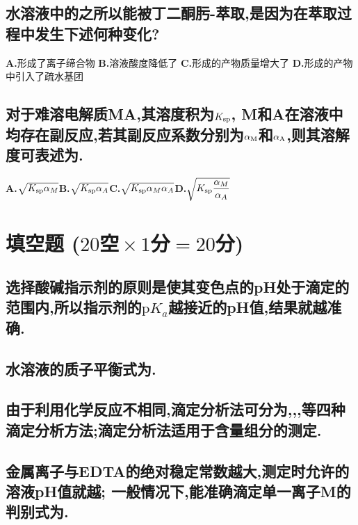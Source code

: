 \documentclass[UTF8]{article}
\newcommand{\p}{\mathrm{p}}
\newcommand{\shortline}{\underline{\hspace{1cm}}}
\newcommand{\longline}{\underline{\hspace{2cm}}}
\newcommand{\bfA}{\textbf{A.}}
\newcommand{\bfB}{\qquad \textbf{B.}}
\newcommand{\bfC}{\qquad \textbf{C.}}
\newcommand{\bfD}{\qquad \textbf{D.}}
\newcommand{\ind}{\hspace{-1pt}}
\newcommand{\indLarge}{\hspace{-0.6cm}}
\begin{document}
    \subsection{水溶液中的\ind 之所以能被丁二酮肟-萃取,是因为在萃取过程中发生下述何种变化?}
        \indLarge \bfA {}\ind 形成了离子缔合物
        \indLarge \bfB 溶液酸度降低了
        \indLarge \bfC {}\ind 形成的产物质量增大了
        \indLarge \bfD {}\ind 形成的产物中引入了疏水基团

    \subsection{对于难溶电解质MA,其溶度积为$K_{\ce{sp}}$, M和A在溶液中均存在副反应,若其副反应系数分别为$\alpha_{\ce{M}}$和$\alpha_{\ce{A}}$,则其溶解度可表述为\shortline.}
    \bfA $\sqrt{K_{\ce{sp}}\alpha_M}$\bfB $\sqrt{K_{\ce{sp}}\alpha_A}$\bfC $\sqrt{K_{\ce{sp}}\alpha_M\alpha_A}$\bfD $\sqrt{K_{\ce{sp}}\dfrac{\alpha_M}{\alpha_A}}$

    \section{填空题 \small($20\!\!$空$\!\!\times 1\!\!$分$\!\!=\!\!20\!\!$分)}
    \subsection{选择酸碱指示剂的原则是使其变色点的pH处于滴定的\longline 范围内,所以指示剂的$\p K_a$越接近\longline 的pH值,结果就越准确.}
    
    \subsection{水溶液的质子平衡式为\underline{\hspace{5cm}}.}
    
    \subsection{由于利用化学反应不相同,滴定分析法可分为\longline ,\longline ,\longline ,\longline 等四种滴定分析方法;滴定分析法适用于\longline 含量组分的测定.}
    
    \subsection{金属离子与EDTA的绝对稳定常数越大,测定时允许的溶液pH值就越\shortline; 一般情况下,能准确滴定单一离子M的判别式为\underline{\hspace{5cm}}.}
    
\end{document}

